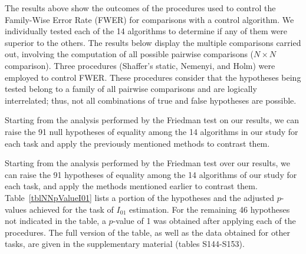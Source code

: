 \documentclass[a4paper,fleqn]{cas-sc}
\begin{document}
The results above show the outcomes of the procedures used to control the Family-Wise Error Rate (FWER)
for comparisons with a control algorithm.
We individually tested each of the 14 algorithms to determine if any of them were superior to the others.
The results below display the multiple comparisons carried out,
involving the computation of all possible pairwise comparisons ($N\times N$ comparison).
Three procedures (Shaffer’s static, Nemenyi, and Holm) were employed to control FWER.
These procedures consider that the hypotheses being tested belong to a family of all
pairwise comparisons and are logically interrelated; thus,
not all combinations of true and false hypotheses are possible.

Starting from the analysis performed by the Friedman test on our results,
we can raise the 91 null hypotheses of equality among
the 14 algorithms in our study for each task and apply the previously mentioned methods to contrast them.

Starting from the analysis performed by the Friedman test over our results, we can raise the
91 hypotheses of equality among the 14 algorithms of our study for each task,
and apply the methods mentioned earlier to contrast them.
Table~\ref{tblNNpValueI01} lists a portion of the hypotheses and the
adjusted $p$-values achieved for the task of $I_{01}$ estimation.
For the remaining 46 hypotheses not indicated in the table,
a $p$-value of 1 was obtained after applying each of the procedures.
The full version of the table, as well as the data obtained for other tasks,
are given in the supplementary material (tables S144-S153).
\end{document}
